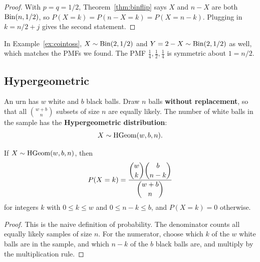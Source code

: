 \medskip

\begin{proof}
With $p = q = 1/2$, Theorem~\ref{thm:binflip} says $X$ and $n - X$ are both $\operatorname{Bin}(n, 1/2)$, so $P(X = k) = P(n - X = k) = P(X = n - k)$. Plugging in $k = n/2 + j$ gives the second statement.
\end{proof}

\bigskip

\begin{example}
In Example~\ref{ex:cointoss}, $X \sim \operatorname{Bin}(2, 1/2)$ and $Y = 2 - X \sim \operatorname{Bin}(2, 1/2)$ as well, which matches the PMFs we found. The PMF $\tfrac14, \tfrac12, \tfrac14$ is symmetric about $1 = n/2$.
\end{example}

\bigskip

\subsection{Hypergeometric}

\bigskip

\begin{story}\label{story:hgeom}
An urn has $w$ white and $b$ black balls. Draw $n$ balls \textbf{without replacement}, so that all $\binom{w+b}{n}$ subsets of size $n$ are equally likely. The number of white balls in the sample has the \textbf{Hypergeometric distribution}:
\medskip
\[
X \sim \operatorname{HGeom}(w, b, n).
\]
\end{story}

\bigskip

\begin{theorem}\label{thm:hgeompmf}
If $X \sim \operatorname{HGeom}(w, b, n)$, then
\medskip
\[
P(X = k) = \frac{\dbinom{w}{k}\dbinom{b}{n-k}}{\dbinom{w+b}{n}}
\]
\medskip
for integers $k$ with $0 \le k \le w$ and $0 \le n - k \le b$, and $P(X = k) = 0$ otherwise.
\end{theorem}

\medskip

\begin{proof}
This is the naive definition of probability. The denominator counts all equally likely samples of size $n$. For the numerator, choose which $k$ of the $w$ white balls are in the sample, and which $n - k$ of the $b$ black balls are, and multiply by the multiplication rule.
\end{proof}

